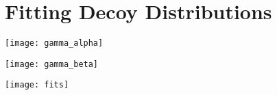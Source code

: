 \section{Fitting Decoy Distributions}

\texttt{[image: gamma\_alpha]}

\texttt{[image: gamma\_beta]}

\texttt{[image: fits]}